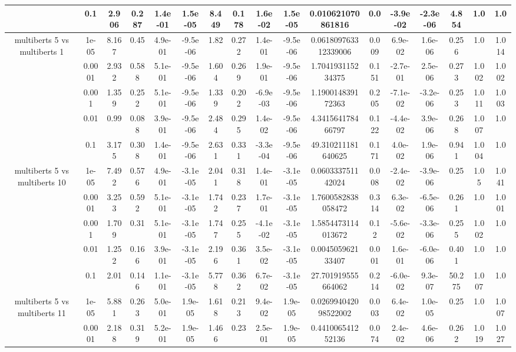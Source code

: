 \begin{tabular}{|c|c|c|c|c|c|c|c|c|c|c|c|c|c|c|c|c|}
 & 0.1 & 2.906 & 0.287 & 1.4e-01 & 1.5e-05 & 8.449 & 0.178 & 1.6e-02 & 1.5e-05 & 0.010621070861816 & 0.0 & -3.9e-02 & -2.3e-06 & 4.854 & 1.0 & 1.0 \\
\hline
\multirow{5}{*}{multiberts 5 vs multiberts 1} & 1e-05 & 8.167 & 0.45 & 4.9e-01 & -9.5e-06 & 1.82 & 0.272 & 1.4e-01 & -9.5e-06 & 0.061809763312339006 & 0.009 & 6.9e-02 & 1.6e-06 & 0.256 & 1.0 & 1.014 \\
 & 0.0001 & 2.932 & 0.588 & 5.1e-01 & -9.5e-06 & 1.604 & 0.269 & 1.9e-01 & -9.5e-06 & 1.704193115234375 & 0.151 & -2.7e-01 & 2.5e-06 & 0.273 & 1.002 & 1.002 \\
 & 0.001 & 1.359 & 0.252 & 5.1e-01 & -9.5e-06 & 1.339 & 0.202 & -6.9e-03 & -9.5e-06 & 1.190014839172363 & 0.205 & -7.1e-02 & -3.2e-06 & 0.253 & 1.011 & 1.003 \\
 & 0.01 & 0.99 & 0.088 & 3.9e-01 & -9.5e-06 & 2.484 & 0.295 & 1.4e-02 & -9.5e-06 & 4.341564178466797 & 0.122 & -4.4e-02 & 3.9e-06 & 0.268 & 1.007 & 1.0 \\
 & 0.1 & 3.175 & 0.308 & 1.4e-01 & -9.5e-06 & 2.631 & 0.331 & -3.3e-04 & -9.5e-06 & 49.310211181640625 & 0.171 & 4.0e-02 & 1.9e-06 & 0.941 & 1.004 & 1.0 \\
\hline
\multirow{5}{*}{multiberts 5 vs multiberts 10} & 1e-05 & 7.492 & 0.576 & 4.9e-01 & -3.1e-05 & 2.041 & 0.318 & 1.4e-01 & -3.1e-05 & 0.060333751142024 & 0.008 & -2.4e-02 & -3.9e-06 & 0.25 & 1.05 & 1.041 \\
 & 0.0001 & 3.253 & 0.592 & 5.1e-01 & -3.1e-05 & 1.742 & 0.237 & 1.7e-01 & -3.1e-05 & 1.7600582838058472 & 0.314 & 6.3e-02 & -6.5e-06 & 0.261 & 1.0 & 1.001 \\
 & 0.001 & 1.709 & 0.31 & 5.1e-01 & -3.1e-05 & 1.747 & 0.255 & -4.1e-02 & -3.1e-05 & 1.5854473114013672 & 0.12 & -5.6e-02 & -3.3e-06 & 0.255 & 1.002 & 1.0 \\
 & 0.01 & 1.252 & 0.166 & 3.9e-01 & -3.1e-05 & 2.196 & 0.361 & 3.5e-02 & -3.1e-05 & 0.004505962133407 & 0.001 & 1.6e-01 & -6.0e-06 & 0.401 & 1.0 & 1.0 \\
 & 0.1 & 2.01 & 0.146 & 1.1e-01 & -3.1e-05 & 5.778 & 0.362 & 6.7e-02 & -3.1e-05 & 27.701919555664062 & 0.214 & -6.0e-02 & 9.3e-07 & 50.275 & 1.007 & 1.0 \\
\hline
\multirow{5}{*}{multiberts 5 vs multiberts 11} & 1e-05 & 5.881 & 0.263 & 5.0e-01 & 1.9e-05 & 1.618 & 0.213 & 9.4e-02 & 1.9e-05 & 0.026994042098522002 & 0.003 & 6.4e-02 & 1.0e-05 & 0.25 & 1.0 & 1.007 \\
 & 0.0001 & 2.188 & 0.319 & 5.2e-01 & 1.9e-05 & 1.466 & 0.23 & 2.5e-01 & 1.9e-05 & 0.441006541252136 & 0.074 & 2.4e-02 & 4.6e-06 & 0.262 & 1.019 & 1.027 \\

\end{tabular}
